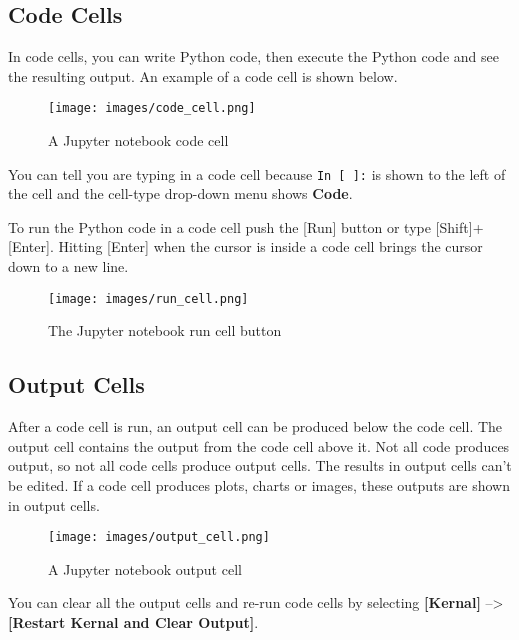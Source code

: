 \documentclass{book}
\makeatletter
\def\maxwidth{\ifdim\Gin@nat@width>\linewidth\linewidth
\else\Gin@nat@width\fi}
\let\Oldincludegraphics\includegraphics
\renewcommand{\includegraphics}[1]{\Oldincludegraphics[width=.8\maxwidth]{#1}}
\newcommand{\passthrough}[1]{#1}
\makeatother
\begin{document}
    
        \hypertarget{code-cells}{%
\subsection{Code Cells}\label{code-cells}}

In code cells, you can write Python code, then execute the Python code
and see the resulting output. An example of a code cell is shown below.

\begin{figure}
\centering
\texttt{[image: images/code\_cell.png]}
\caption{A Jupyter notebook code cell}
\end{figure}

You can tell you are typing in a code cell because
\passthrough{\lstinline!In [ ]:!} is shown to the left of the cell and
the cell-type drop-down menu shows \textbf{Code}.

To run the Python code in a code cell push the {[}Run{]} button or type
{[}Shift{]}+{[}Enter{]}. Hitting {[}Enter{]} when the cursor is inside a
code cell brings the cursor down to a new line.

\begin{figure}
\centering
\texttt{[image: images/run\_cell.png]}
\caption{The Jupyter notebook run cell button}
\end{figure}
    




    
        \hypertarget{output-cells}{%
\subsection{Output Cells}\label{output-cells}}

After a code cell is run, an output cell can be produced below the code
cell. The output cell contains the output from the code cell above it.
Not all code produces output, so not all code cells produce output
cells. The results in output cells can't be edited. If a code cell
produces plots, charts or images, these outputs are shown in output
cells.

\begin{figure}
\centering
\texttt{[image: images/output\_cell.png]}
\caption{A Jupyter notebook output cell}
\end{figure}

You can clear all the output cells and re-run code cells by selecting
\textbf{{[}Kernal{]}} --\textgreater{} \textbf{{[}Restart Kernal and
Clear Output{]}}.
\end{document}
